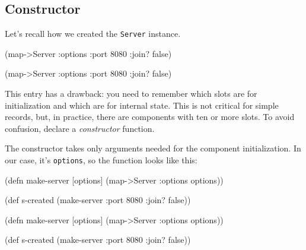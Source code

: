 \subsection{Constructor}


Let's recall how we created the \verb|Server| instance.

\ifnarrow

\begin{english}
  \begin{clojure}
(map->Server
  {:options {:port 8080
             :join? false}})
  \end{clojure}
\end{english}

\else

\begin{english}
  \begin{clojure}
(map->Server {:options {:port 8080 :join? false}})
  \end{clojure}
\end{english}

\fi


This entry has a drawback: you need to remember which slots are for initialization and which are for internal state. This is not critical for simple records, but, in practice, there are components with ten or more slots. To avoid confusion, declare a \emph{constructor} function.

The constructor takes only arguments needed for the component initialization. In our case, it's \verb|options|, so the function looks like this:

\ifnarrow

\begin{english}
  \begin{clojure}
(defn make-server
  [options]
  (map->Server {:options options}))

(def s-created
  (make-server {:port 8080
                :join? false}))
  \end{clojure}
\end{english}

\else

\begin{english}
  \begin{clojure}
(defn make-server
  [options]
  (map->Server {:options options}))

(def s-created (make-server {:port 8080 :join? false}))
  \end{clojure}
\end{english}


